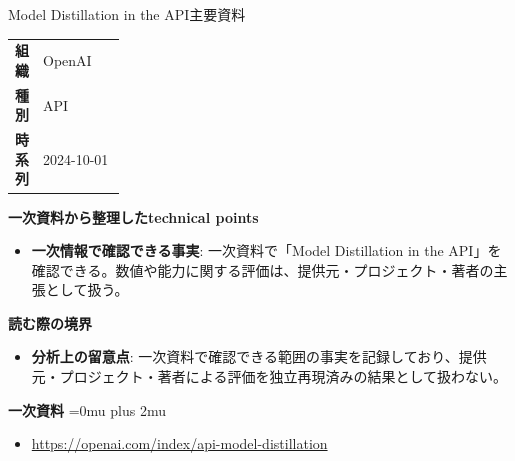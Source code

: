 \begin{technicalnote}{Model Distillation in the API}{主要資料}
\begingroup
\begin{tabularx}{\linewidth}{@{}>{\bfseries}p{0.22\linewidth}X@{}}
組織 & OpenAI \\
種別 & API \\
時系列 & 2024-10-01 \\
\end{tabularx}
\smallskip
{\bfseries 一次資料から整理したtechnical points}
\begin{itemize}[leftmargin=1.5em,itemsep=0.35em]
\item \textbf{一次情報で確認できる事実}: 一次資料で「Model Distillation in the API」を確認できる。数値や能力に関する評価は、提供元・プロジェクト・著者の主張として扱う。
\end{itemize}
\begin{minipage}{\linewidth}
{\bfseries 読む際の境界}
\begin{itemize}[leftmargin=1.5em,itemsep=0.35em]
\item \textbf{分析上の留意点}: 一次資料で確認できる範囲の事実を記録しており、提供元・プロジェクト・著者による評価を独立再現済みの結果として扱わない。
\end{itemize}
\begin{samepage}
{\bfseries 一次資料}
\begingroup\sloppy
\Urlmuskip=0mu plus 2mu\relax
\begin{itemize}[leftmargin=1.5em,itemsep=0.25em]
\item {\scriptsize\url{https://openai.com/index/api-model-distillation}}
\end{itemize}
\endgroup
\end{samepage}
\end{minipage}
\endgroup
\end{technicalnote}
\medskip

